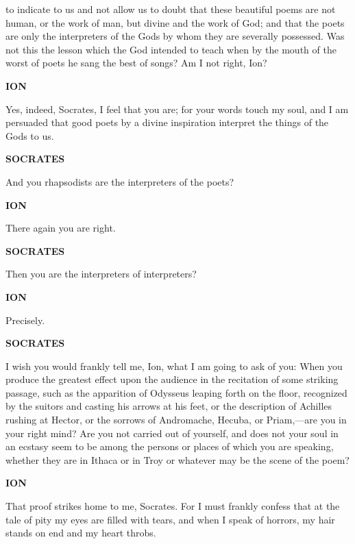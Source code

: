 \documentclass[11pt,letter]{article}
\begin{document}
to indicate to us and not allow us to doubt that these beautiful poems are not human, or the work of man, but divine and the work of God; and that the poets are only the interpreters of the Gods by whom they are severally possessed. Was not this the lesson which the God intended to teach when by the mouth of the worst of poets he sang the best of songs? Am I not right, Ion?

\par \textbf{ION}
\par   Yes, indeed, Socrates, I feel that you are; for your words touch my soul, and I am persuaded that good poets by a divine inspiration interpret the things of the Gods to us.

\par \textbf{SOCRATES}
\par   And you rhapsodists are the interpreters of the poets?

\par \textbf{ION}
\par   There again you are right.

\par \textbf{SOCRATES}
\par   Then you are the interpreters of interpreters?

\par \textbf{ION}
\par   Precisely.

\par \textbf{SOCRATES}
\par   I wish you would frankly tell me, Ion, what I am going to ask of you:  When you produce the greatest effect upon the audience in the recitation of some striking passage, such as the apparition of Odysseus leaping forth on the floor, recognized by the suitors and casting his arrows at his feet, or the description of Achilles rushing at Hector, or the sorrows of Andromache, Hecuba, or Priam,—are you in your right mind? Are you not carried out of yourself, and does not your soul in an ecstasy seem to be among the persons or places of which you are speaking, whether they are in Ithaca or in Troy or whatever may be the scene of the poem?

\par \textbf{ION}
\par   That proof strikes home to me, Socrates. For I must frankly confess that at the tale of pity my eyes are filled with tears, and when I speak of horrors, my hair stands on end and my heart throbs.
\end{document}
